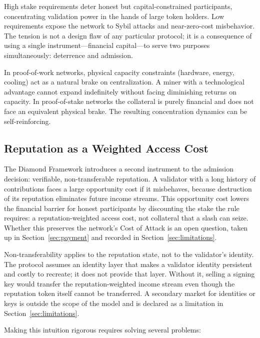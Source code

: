 \documentclass[11pt,a4paper]{article}
\numberwithin{equation}{section}
\numberwithin{table}{section}
\begin{document}
High stake requirements deter honest but capital-constrained participants, concentrating validation power in the hands of large token holders. Low requirements expose the network to Sybil attacks and near-zero-cost misbehavior. The tension is not a design flaw of any particular protocol; it is a consequence of using a single instrument---financial capital---to serve two purposes simultaneously: deterrence and admission.

In proof-of-work networks, physical capacity constraints (hardware, energy, cooling) act as a natural brake on centralization. A miner with a technological advantage cannot expand indefinitely without facing diminishing returns on capacity. In proof-of-stake networks the collateral is purely financial and does not face an equivalent physical brake. The resulting concentration dynamics can be self-reinforcing.

\subsection{Reputation as a Weighted Access Cost}
The Diamond Framework introduces a second instrument to the admission decision: verifiable, non-transferable reputation. A validator with a long history of contributions faces a large opportunity cost if it misbehaves, because destruction of its reputation eliminates future income streams. This opportunity cost lowers the financial barrier for honest participants by discounting the stake the rule requires: a reputation-weighted access cost, not collateral that a slash can seize. Whether this preserves the network's Cost of Attack is an open question, taken up in Section~\ref{sec:payment} and recorded in Section~\ref{sec:limitations}.

Non-transferability applies to the reputation state, not to the validator's identity. The protocol assumes an identity layer that makes a validator identity persistent and costly to recreate; it does not provide that layer. Without it, selling a signing key would transfer the reputation-weighted income stream even though the reputation token itself cannot be transferred. A secondary market for identities or keys is outside the scope of the model and is declared as a limitation in Section~\ref{sec:limitations}.

Making this intuition rigorous requires solving several problems:
\end{document}

